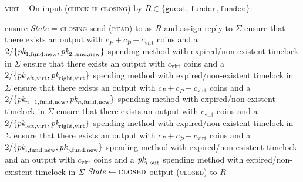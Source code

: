 \begin{center}
  \begin{processbox}{\textsc{virt} -- On input (\textsc{check if closing}) by
  $R \in \{\texttt{guest}, \texttt{funder}, \texttt{fundee}\}$:}
    \begin{algorithmic}[1]
      \State ensure \textit{State} = \textsc{closing}
      \State send (\textsc{read}) to \ledger as $R$ and assign reply to $\Sigma$
       
        \State ensure that there exists an output with $c_P + c_{\bar{P}} -
        c_{\mathrm{virt}}$ coins and a $2/\{\textit{pk}_{1, \mathrm{fund}, \mathrm{new}},
        \textit{pk}_{2, \mathrm{fund}, \mathrm{new}}\}$ spending method with
        expired/non-existent timelock in $\Sigma$ 
        \label{code:virtual-layer:check-chain-close:funder:output-virt}
        \State ensure that there exists an output with $c_{\mathrm{virt}}$ coins
        and a $2/\{\textit{pk}_{\mathrm{left}, \mathrm{virt}}, \textit{pk}_{\mathrm{right},
        \mathrm{virt}}\}$ spending method with expired/non-existent timelock in
        $\Sigma$ 
        \label{code:virtual-layer:check-chain-close:funder:output-funder}
       
        \State ensure that there exists an output with $c_P + c_{\bar{P}} -
        c_{\mathrm{virt}}$ coins and a $2/\{\textit{pk}_{n-1, \mathrm{fund},
        \mathrm{new}}, \textit{pk}_{n, \mathrm{fund}, \mathrm{new}}\}$ spending method
        with expired/non-existent timelock in $\Sigma$ 
        \State ensure that there exists an output with $c_{\mathrm{virt}}$ coins
        and a $2/\{\textit{pk}_{\mathrm{left}, \mathrm{virt}}, \textit{pk}_{\mathrm{right},
        \mathrm{virt}}\}$ spending method with expired/non-existent timelock in
        $\Sigma$ 
      \Else \: 
         
        \State ensure that there exists an output with $c_P + c_{\bar{P}} -
        c_{\mathrm{virt}}$ coins and a $2/\{\textit{pk}_{i, \mathrm{fund}, \mathrm{new}},
        \textit{pk}_{j, \mathrm{fund}, \mathrm{new}}\}$ spending method with
        expired/non-existent timelock and an output with $c_{\mathrm{virt}}$
        coins and a $\textit{pk}_{i, \mathrm{out}}$ spending method with
        expired/non-existent timelock in $\Sigma$
      \EndIf
      \State $\textit{State} \gets \textsc{closed}$
      \State output (\textsc{closed}) to $R$
    \end{algorithmic}
  \end{processbox}
  \label{code:virtual-layer:check-chain-close}
\end{center}


